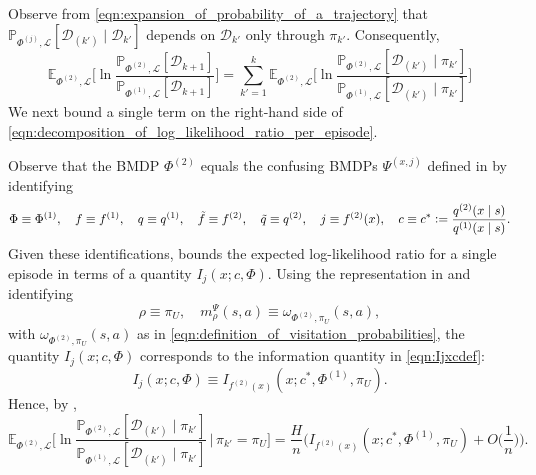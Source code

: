 \documentclass[11pt]{article}
\newcommand{\eqdef}{\vcentcolon=}
\newcommand{\mcD}{\mathcal{D}}
\newcommand{\mcL}{\mathcal{L}}
\newcommand{\mbbP}{\mathbb{P}}
\newcommand{\mbbE}{\mathbb{E}}
\theoremstyle{definition}
\theoremstyle{definition}
\begin{document}
Observe from \eqref{eqn:expansion_of_probability_of_a_trajectory} that $\mbbP_{\Phi^{(j)},\mcL}[\mcD_{(k')}\mid \mcD_{k'}]$ depends on $\mcD_{k'}$ only through $\pi_{k'}$.
Consequently,
\begin{equation}
	\label{eqn:decomposition_of_log_likelihood_ratio_per_episode}
	\mbbE_{\Phi^{(2)},\mcL}\biggl[
		\ln\frac{\mbbP_{\Phi^{(2)},\mcL}[\mcD_{k+1}]}{\mbbP_{\Phi^{(1)},\mcL}[\mcD_{k+1}]}
	\biggr]
	=
	\sum_{k'=1}^k
	\mbbE_{\Phi^{(2)},\mcL}\biggl[
		\ln\frac{\mbbP_{\Phi^{(2)},\mcL}[\mcD_{(k')}\mid \pi_{k' }]}{\mbbP_{\Phi^{(1)},\mcL}[\mcD_{(k')}\mid \pi_{k' }]}
	\biggr]
\end{equation}
We next bound a single term on the right-hand side of \eqref{eqn:decomposition_of_log_likelihood_ratio_per_episode}.

Observe that the \gls{BMDP} $\Phi^{(2)}$ equals the confusing \glspl{BMDP} $\Psi^{(x,j)}$ defined in \cite[(24)--(26)]{Jedra:2022} by identifying
\begin{equation}
	\label{eqn:identifications_with_confusing_BMDP}
	\Phi \equiv \Phi^{(1)},
	\quad
	f \equiv f^{(1)},
	\quad
	q \equiv q^{(1)},
	\quad
	\tilde{f} \equiv f^{(2)},
	\quad
	\tilde{q} \equiv q^{(2)},
	\quad
	j \equiv f^{(2)}(x),
	\quad
	c
	\equiv
	c^*
	\eqdef
	\frac{q^{(2)}(x\mid s)}{q^{(1)}(x\mid s)}
	.
\end{equation}
Given these identifications, \cite[Proposition 8]{Jedra:2022} bounds the expected log-likelihood ratio for a single episode in terms of a quantity $I_j(x;c,\Phi)$.
Using the representation in \cite[Eqn.~(35)]{Jedra:2022} and identifying 
\begin{equation}
	\label{eqn:policy_and_visitation_rate_identification}
	\rho \equiv \pi_U
	,
	\quad
	m^{\Psi}_{\rho}(s,a)
	\equiv
	\omega_{\Phi^{(2)},\pi_U}(s,a)
	,
\end{equation}
with $\omega_{\Phi^{(2)},\pi_U}(s,a)$ as in \eqref{eqn:definition_of_visitation_probabilities}, the quantity $I_j(x;c,\Phi)$ corresponds to the information quantity in \eqref{eqn:Ijxcdef}:
\begin{equation}
	I_j(x;c,\Phi)
	\equiv
	I_{f^{(2)}(x)}(x;c^*,\Phi^{(1)},\pi_U)
	.
\end{equation}
Hence, by \cite[Proposition 8]{Jedra:2022},
\begin{equation}
	\label{eqn:bound_on_log_likelihood_ratio_in_terms_of_information_quantity}
	\mbbE_{\Phi^{(2)},\mcL}\biggl[
	\ln\frac{\mbbP_{\Phi^{(2)},\mcL}[\mcD_{(k')}
	\mid \pi_{k'}]}{\mbbP_{\Phi^{(1)},\mcL}[\mcD_{(k')}
	\mid \pi_{k'}]}
	\,\bigg|\, \pi_{k'} = \pi_U
	\biggr]
	=
	\frac{H}{n}
	\biggl(
		I_{f^{(2)}(x)}(x;c^*,\Phi^{(1)},\pi_{U})+O\biggl(\frac{1}{n}\biggr)
	\biggr)
	.
\end{equation}
\end{document}

